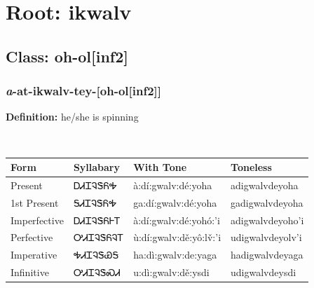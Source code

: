 \needspace{4in}
\section*{Root: ikwalv}
\nopagebreak
{}
\needspace{3in}
\subsection*{Class: oh-ol[inf2]}
\nopagebreak
\needspace{2in}
\subsubsection*{\textit{a}{-}at{-}\textbf{ikwalv}{-}tey{-}[oh-ol[inf2]]}
\nopagebreak
\textbf{Definition: } he/she is spinning
\\[0.5em]
\begin{tabularx}{\textwidth}{l X X X}%
\toprule%
\textbf{Form}&\textbf{Syllabary}&\textbf{With Tone}&\textbf{Toneless}\\%
\midrule%
Present&ᎠᏗᏆᎸᏕᏲᎭ&à:dí:gwalv:dé:yoha&adigwalvdeyoha\\%
1st Present&ᎦᏗᏆᎸᏕᏲᎭ&ga:dí:gwalv:dé:yoha&gadigwalvdeyoha\\%
Imperfective&ᎠᏗᏆᎸᏕᏲᎰᎢ&à:dí:gwalv:dé:yohó:’i&adigwalvdeyoho’i\\%
Perfective&ᎤᏗᏆᎸᏕᏲᎸᎢ&ù:dí:gwalv:dě:yô:lv̌:’i&udigwalvdeyolv’i\\%
Imperative&ᎭᏗᏆᎸᏕᏯᎦ&ha:dì:gwalv:de:yaga&hadigwalvdeyaga\\%
Infinitive&ᎤᏗᏆᎸᏕᏍᏗ&u:dì:gwalv:dě:ysdi&udigwalvdeysdi\\%
\bottomrule%
\end{tabularx}
\\[1em]